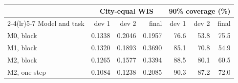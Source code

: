 \begin{tabular}{lrrrrrr}
\toprule
& \multicolumn{3}{c}{City-equal WIS} & \multicolumn{3}{c}{90\% coverage (\%)} \\
\cmidrule(lr){2-4}\cmidrule(lr){5-7}
Model and task & dev 1 & dev 2 & final & dev 1 & dev 2 & final \\
\midrule
M0, block & 0.1338 & 0.2046 & 0.1957 & 76.6 & 53.8 & 75.5 \\
M1, block & 0.1320 & 0.1893 & 0.3690 & 85.1 & 70.8 & 54.9 \\
M2, block & 0.1265 & 0.1577 & 0.3394 & 88.5 & 80.1 & 60.5 \\
M2, one-step & 0.1084 & 0.1238 & 0.2085 & 90.3 & 87.2 & 72.0 \\
\bottomrule
\end{tabular}
